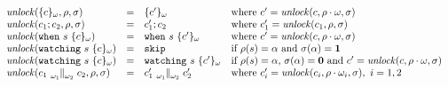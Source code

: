 $$
  \begin{array}{lcll}
    \unlock(\{c\}_\omega, \env,\sigma)                      & = & \{c'\}_\omega                      & {\text{where }} c'=\unlock(c,\env\cdot\omega,\heap)                                              \\
    \unlock(c_1;c_2, \env,\sigma)                           & = & c_1';c_2                           & {\text{where }} c_1'=\unlock(c_1,\env,\heap)                                                     \\
    \unlock(\when{s}{\{c\}_\omega})                         & = & \when{s}{\{c'\}_\omega}            & {\text{where }} c'=\unlock(c,\env\cdot\omega,\heap)                                              \\
    \unlock(\watching{s}{\{c\}_\omega})                     & = & \skipp                             & {\text{if $\rho(s)=\alpha$ and $\sigma(\alpha)=\present$}}                                       \\
    \unlock(\watching{s}{\{c\}_\omega})                     & = & \watching{s}{\{c'\}_\omega}        & {\text{if $\rho(s)=\alpha$, $\sigma(\alpha)=\absent$ and $c'=\unlock(c,\env\cdot\omega,\heap)$}} \\
    \unlock(c_1 \parl{\omega_1}{\omega_2} c_2, \env, \heap) & = & c_1'\parl{\omega_1}{\omega_2} c_2' & {\text{where }} c_i' = \unlock(c_i,\env\cdot\omega_i,\heap),~i=1,2
  \end{array}
$$

